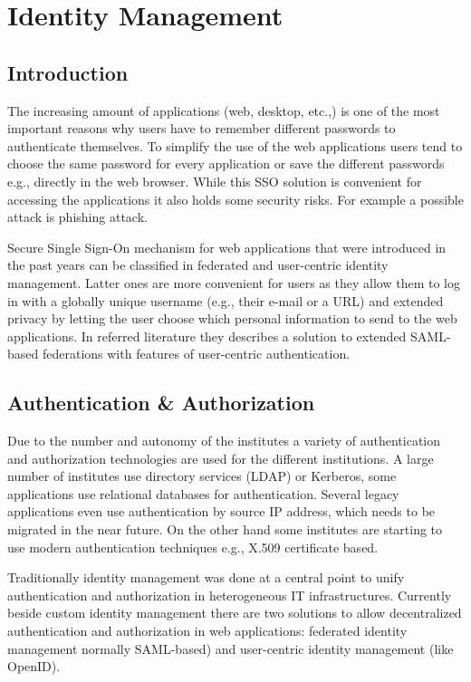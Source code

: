 \documentclass[12pt]{report}
\begin{document}
\section{Identity Management}
	\subsection{Introduction}
		The increasing amount of applications (web, desktop, etc.,) is one of the most important reasons why users have to remember different passwords to authenticate themselves. To simplify the use of the web applications users tend to choose the same password for every application or save the different passwords e.g., directly in the web browser. While this SSO solution is convenient for accessing the applications it also holds some security risks. For example a possible attack is phishing attack.\newline
	
             Secure Single Sign-On mechanism for web applications that were introduced in the past years can be classified in federated and user-centric identity management. Latter ones are more convenient for users as they allow them to log in with a globally unique username (e.g., their e-mail or a URL) and extended privacy by letting the user choose which personal information to send to the web applications. In referred literature they describes a solution to extended SAML-based federations with features of user-centric authentication.
   \subsection{Authentication \& Authorization}
		Due to the number and autonomy of the institutes a variety of authentication and authorization technologies are used for the different institutions. A large number of institutes use directory services (LDAP) or Kerberos, some applications use relational databases for authentication. Several legacy applications even use authentication by source IP address, which needs to be migrated in the near future. On the other hand some institutes are starting to use modern authentication techniques e.g., X.509 certificate based.\newline
   
	Traditionally identity management was done at a central point to unify authentication and authorization in heterogeneous IT infrastructures. Currently beside custom identity management there are two solutions to allow decentralized authentication and authorization in web applications: federated identity management normally SAML-based) and user-centric identity management (like OpenID).
\end{document}
